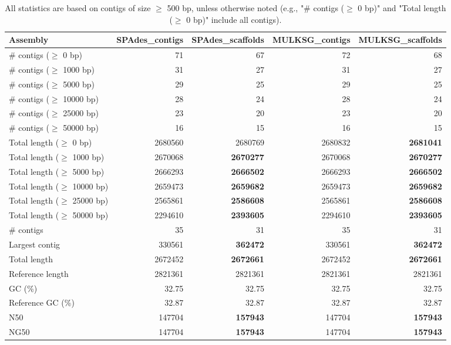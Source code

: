 \documentclass[12pt,a4paper]{article}
\begin{document}
\begin{table}[ht]
\begin{center}
\caption{All statistics are based on contigs of size $\geq$ 500 bp, unless otherwise noted (e.g., "\# contigs ($\geq$ 0 bp)" and "Total length ($\geq$ 0 bp)" include all contigs).}
\begin{tabular}{|l*{4}{|r}|}
\hline
Assembly & SPAdes\_contigs & SPAdes\_scaffolds & MULKSG\_contigs & MULKSG\_scaffolds \\ \hline
\# contigs ($\geq$ 0 bp) & 71 & 67 & 72 & 68 \\ \hline
\# contigs ($\geq$ 1000 bp) & 31 & 27 & 31 & 27 \\ \hline
\# contigs ($\geq$ 5000 bp) & 29 & 25 & 29 & 25 \\ \hline
\# contigs ($\geq$ 10000 bp) & 28 & 24 & 28 & 24 \\ \hline
\# contigs ($\geq$ 25000 bp) & 23 & 20 & 23 & 20 \\ \hline
\# contigs ($\geq$ 50000 bp) & 16 & 15 & 16 & 15 \\ \hline
Total length ($\geq$ 0 bp) & 2680560 & 2680769 & 2680832 & {\bf 2681041} \\ \hline
Total length ($\geq$ 1000 bp) & 2670068 & {\bf 2670277} & 2670068 & {\bf 2670277} \\ \hline
Total length ($\geq$ 5000 bp) & 2666293 & {\bf 2666502} & 2666293 & {\bf 2666502} \\ \hline
Total length ($\geq$ 10000 bp) & 2659473 & {\bf 2659682} & 2659473 & {\bf 2659682} \\ \hline
Total length ($\geq$ 25000 bp) & 2565861 & {\bf 2586608} & 2565861 & {\bf 2586608} \\ \hline
Total length ($\geq$ 50000 bp) & 2294610 & {\bf 2393605} & 2294610 & {\bf 2393605} \\ \hline
\# contigs & 35 & 31 & 35 & 31 \\ \hline
Largest contig & 330561 & {\bf 362472} & 330561 & {\bf 362472} \\ \hline
Total length & 2672452 & {\bf 2672661} & 2672452 & {\bf 2672661} \\ \hline
Reference length & 2821361 & 2821361 & 2821361 & 2821361 \\ \hline
GC (\%) & 32.75 & 32.75 & 32.75 & 32.75 \\ \hline
Reference GC (\%) & 32.87 & 32.87 & 32.87 & 32.87 \\ \hline
N50 & 147704 & {\bf 157943} & 147704 & {\bf 157943} \\ \hline
NG50 & 147704 & {\bf 157943} & 147704 & {\bf 157943} \\ \hline

\end{tabular}
\end{center}
\end{table}
\end{document}
